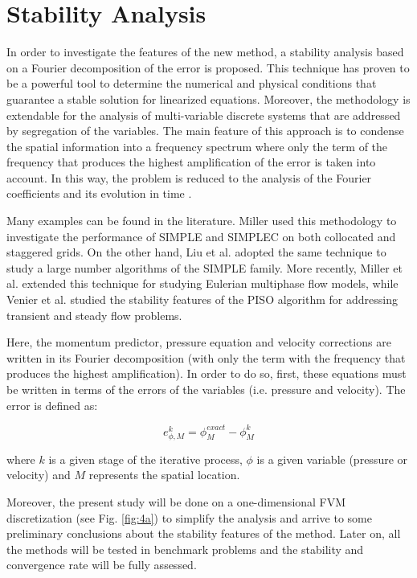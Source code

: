 \documentclass[final,3p,times,11pt,onecolumn]{myElsarticle}
\numberwithin{equation}{section}
\begin{document}
\section{Stability Analysis}
\label{sec:fourier}

In order to investigate the features of the new method, a stability analysis based on a Fourier decomposition of the error is proposed. This technique has proven to be a powerful tool to determine the numerical and physical conditions that guarantee a stable solution for linearized equations. Moreover, the methodology is extendable for the analysis of multi-variable discrete systems that are addressed by segregation of the variables. The main feature of this approach is to condense the spatial information into a frequency spectrum where only the term of the frequency that produces the highest amplification of the error is taken into account. In this way, the problem is reduced to the analysis of the Fourier coefficients and its evolution in time \cite{hirsch}.

Many examples can be found in the literature. Miller \cite{miller} used this methodology to investigate the performance of SIMPLE and SIMPLEC on both collocated and staggered grids. On the other hand, Liu et al. \cite{liu} adopted the same technique to study a large number algorithms of the SIMPLE family. More recently, Miller et al. \cite{miller2} extended this technique for studying Eulerian multiphase flow models, while Venier et al. \cite{venier} studied the stability features of the PISO algorithm for addressing transient and steady flow problems.

Here, the momentum predictor, pressure equation and velocity corrections are written in its Fourier decomposition (with only the term with the frequency that produces the highest amplification). In order to do so, first, these equations must be written in terms of the errors of the variables (i.e. pressure and velocity). The error is defined as:

\begin{equation}
    e^k_{\phi,M} = \phi^{exact}_{M}-\phi_M^{k}
\end{equation}

\noindent where $k$ is a given stage of the iterative process, $\phi$ is a given variable (pressure or velocity) and $M$ represents the spatial location.

Moreover, the present study will be done on a one-dimensional FVM discretization (see Fig. \ref{fig:4a}) to simplify the analysis and arrive to some preliminary conclusions about the stability features of the method. Later on, all the methods will be tested in benchmark problems and the stability and convergence rate will be fully assessed. 
\end{document}
